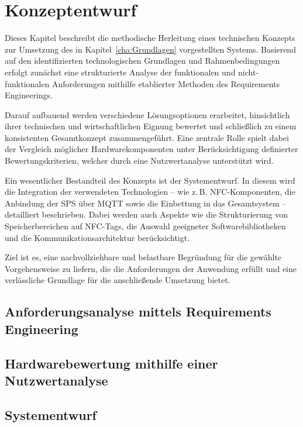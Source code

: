 \chapter{Konzeptentwurf}
\label{cha:vorgehen}

Dieses Kapitel beschreibt die methodische Herleitung eines technischen Konzepts zur Umsetzung des in Kapitel~\ref{cha:Grundlagen} vorgestellten Systems. Basierend auf den identifizierten technologischen Grundlagen und Rahmenbedingungen erfolgt zunächst eine strukturierte Analyse der funktionalen und nicht-funktionalen Anforderungen mithilfe etablierter Methoden des Requirements Engineerings.

Darauf aufbauend werden verschiedene Lösungsoptionen erarbeitet, hinsichtlich ihrer technischen und wirtschaftlichen Eignung bewertet und schließlich zu einem konsistenten Gesamtkonzept zusammengeführt. Eine zentrale Rolle spielt dabei der Vergleich möglicher Hardwarekomponenten unter Berücksichtigung definierter Bewertungskriterien, welcher durch eine Nutzwertanalyse unterstützt wird.

Ein wesentlicher Bestandteil des Konzepts ist der Systementwurf. In diesem wird die Integration der verwendeten Technologien – wie z.\,B. NFC-Komponenten, die Anbindung der SPS über MQTT sowie die Einbettung in das Gesamtsystem – detailliert beschrieben. Dabei werden auch Aspekte wie die Strukturierung von Speicherbereichen auf NFC-Tags, die Auswahl geeigneter Softwarebibliotheken und die Kommunikationsarchitektur berücksichtigt. 

Ziel ist es, eine nachvollziehbare und belastbare Begründung für die gewählte Vorgehensweise zu liefern, die die Anforderungen der Anwendung erfüllt und eine verlässliche Grundlage für die anschließende Umsetzung bietet.


\section{Anforderungsanalyse mittels Requirements Engineering}
\label{sec:anforderungsanalyse}

\section{Hardwarebewertung mithilfe einer Nutzwertanalyse}
\label{sec:hardwarebewertung}

\section{Systementwurf}
\label{sec:systementwurf}